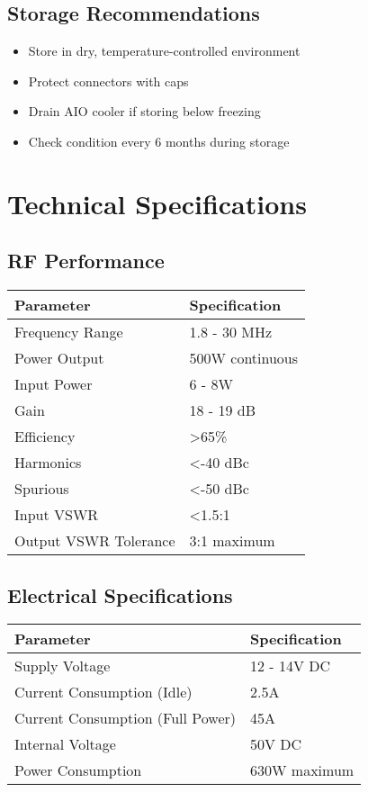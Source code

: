 \documentclass[11pt,a4paper]{article}
\begin{document}
\subsection{Storage Recommendations}
\begin{itemize}
    \item Store in dry, temperature-controlled environment
    \item Protect connectors with caps
    \item Drain AIO cooler if storing below freezing
    \item Check condition every 6 months during storage
\end{itemize}

\section{Technical Specifications}

\subsection{RF Performance}
\begin{center}
\begin{tabular}{|l|l|}
\hline
\textbf{Parameter} & \textbf{Specification} \\
\hline
Frequency Range & 1.8 - 30 MHz \\
Power Output & 500W continuous \\
Input Power & 6 - 8W \\
Gain & 18 - 19 dB \\
Efficiency & >65\% \\
Harmonics & <-40 dBc \\
Spurious & <-50 dBc \\
Input VSWR & <1.5:1 \\
Output VSWR Tolerance & 3:1 maximum \\
\hline
\end{tabular}
\end{center}

\subsection{Electrical Specifications}
\begin{center}
\begin{tabular}{|l|l|}
\hline
\textbf{Parameter} & \textbf{Specification} \\
\hline
Supply Voltage & 12 - 14V DC \\
Current Consumption (Idle) & 2.5A \\
Current Consumption (Full Power) & 45A \\
Internal Voltage & 50V DC \\
Power Consumption & 630W maximum \\
\hline
\end{tabular}
\end{center}
\end{document}
